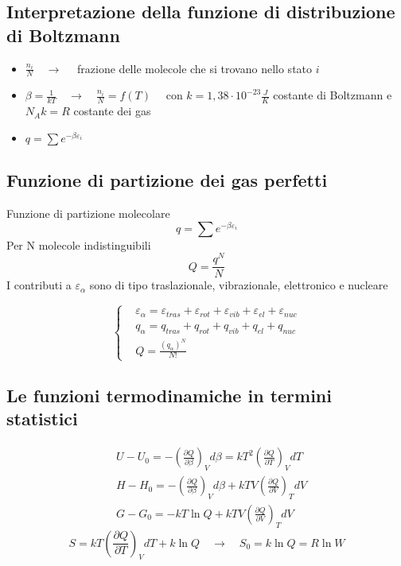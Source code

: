 \documentclass{article}
\newcommand{\so}{\quad \rightarrow \quad}
\newcommand{\dpar}[3]{\left(\frac{\partial #1}{\partial #2}\right)_{#3}d#2}
\begin{document}
\subsection{Interpretazione della funzione di distribuzione di Boltzmann}
\begin{itemize}
    \item $\frac{n_i}{N} \so$ frazione delle molecole che si trovano nello stato $i$
    \item $\beta=\frac{1}{kT} \so \frac{n_i}{N}=f(T) \quad$ con $k=1,38\cdot 10^{-23}\frac{J}{K}$ costante di Boltzmann e $N_Ak=R$ costante dei gas
    \item $q=\sum e^{-\beta \varepsilon_i}$
\end{itemize}

\subsection{Funzione di partizione dei gas perfetti}
Funzione di partizione molecolare 
\begin{equation*}
    q=\sum e^{-\beta \varepsilon_i}
\end{equation*}
Per N molecole indistinguibili
\begin{equation*}
    Q=\frac{q^N}{N}
\end{equation*}
I contributi a $\varepsilon_\alpha$ sono di tipo traslazionale, vibrazionale, elettronico e nucleare

\begin{equation*}
    \begin{cases}
        &\varepsilon_{\alpha}=\varepsilon_{tras}+\varepsilon_{rot}+\varepsilon_{vib}+\varepsilon_{el}+\varepsilon_{nuc}\\
        &q_{\alpha}=q_{tras}+q_{rot}+q_{vib}+q_{el}+q_{nuc}\\
        &Q=\frac{(q_\alpha)^N}{N!}
    \end{cases}
\end{equation*}

\subsection{Le funzioni termodinamiche in termini statistici}
\begin{align*}
    &U-U_0=-\dpar{Q}{\beta}{V}=kT^2\dpar{Q}{T}{V}\\
    &H-H_0=-\dpar{Q}{\beta}{V}+kTV\dpar{Q}{V}{T}\\
    &G-G_0=-kT\ln Q+kTV\dpar{Q}{V}{T}
\end{align*}
\begin{equation*}
    S=kT\dpar{Q}{T}{V}+k\ln Q \so S_0=k\ln Q=R\ln W
\end{equation*}
\end{document}

